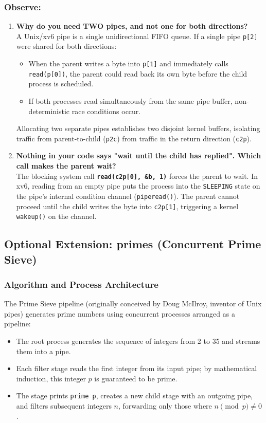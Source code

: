 \documentclass{labreport}
\begin{document}
\subsubsection*{Observe:}
\begin{enumerate}[leftmargin=*]
    \item \textbf{Why do you need TWO pipes, and not one for both directions?}\\[0.2em]
    A Unix/xv6 pipe is a single unidirectional FIFO queue. If a single pipe \texttt{p[2]} were shared for both directions:
    \begin{itemize}[noitemsep]
        \item When the parent writes a byte into \texttt{p[1]} and immediately calls \texttt{read(p[0])}, the parent could read back its own byte before the child process is scheduled.
        \item If both processes read simultaneously from the same pipe buffer, non-deterministic race conditions occur.
    \end{itemize}
    Allocating two separate pipes establishes two disjoint kernel buffers, isolating traffic from parent-to-child (\texttt{p2c}) from traffic in the return direction (\texttt{c2p}).

    \item \textbf{Nothing in your code says "wait until the child has replied". Which call makes the parent wait?}\\[0.2em]
    The blocking system call \textbf{\texttt{read(c2p[0], \&b, 1)}} forces the parent to wait. In xv6, reading from an empty pipe puts the process into the \texttt{SLEEPING} state on the pipe's internal condition channel (\texttt{piperead()}). The parent cannot proceed until the child writes the byte into \texttt{c2p[1]}, triggering a kernel \texttt{wakeup()} on the channel.
\end{enumerate}

\subsection{Optional Extension: primes (Concurrent Prime Sieve)}

\subsubsection{Algorithm and Process Architecture}
The Prime Sieve pipeline (originally conceived by Doug McIlroy, inventor of Unix pipes) generates prime numbers using concurrent processes arranged as a pipeline:
\begin{itemize}[noitemsep]
    \item The root process generates the sequence of integers from 2 to 35 and streams them into a pipe.
    \item Each filter stage reads the first integer from its input pipe; by mathematical induction, this integer $p$ is guaranteed to be prime.
    \item The stage prints \texttt{prime p}, creates a new child stage with an outgoing pipe, and filters subsequent integers $n$, forwarding only those where $n \pmod p \neq 0$.
\end{itemize}
\end{document}
